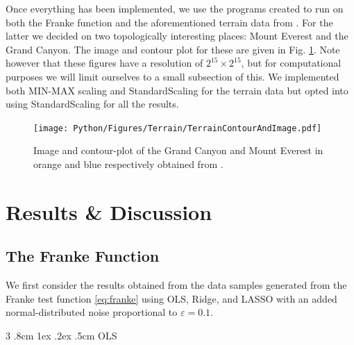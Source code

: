 \documentclass[%
reprint,
amsmath,amssymb,
aps,
pra,
]{revtex4-2}
\makeatletter
\renewcommand{\subsubsection}{%
	\@startsection
	{subsubsection}%
	{3}%
	{\z@}%
	{.8cm \@plus1ex \@minus .2ex}%
	{.5cm}%
	{\normalfont\small\centering}%
}
\makeatother
\begin{document}
Once everything has been implemented, we use the programs created to run on both the Franke function and the aforementioned terrain data from \cite{USGS_EarthExplorer}. For the latter we decided on two topologically interesting places: Mount Everest and the Grand Canyon. The image and contour plot for these are given in Fig. \ref{fig:GC_ME_Image_Contour}. Note however that these figures have a resolution of $2^{15}\times 2^{15}$, but for computational purposes we will limit ourselves to a small subsection of this. We implemented both MIN-MAX scaling and StandardScaling for the terrain data but opted into using StandardScaling for all the results.
\begin{figure}
	\texttt{[image: Python/Figures/Terrain/TerrainContourAndImage.pdf]}
	\caption{Image and contour-plot of the Grand Canyon and Mount Everest in orange and blue respectively obtained from \cite{USGS_EarthExplorer}.}
	\label{fig:GC_ME_Image_Contour}
\end{figure}

\section{Results \& Discussion}

\subsection{The Franke Function}
We first consider the results obtained from the data samples generated from the Franke test function \eqref{eq:franke} using OLS, Ridge, and LASSO with an added normal-distributed noise proportional to \(\varepsilon=0.1\).
\subsubsection{OLS}
\end{document}
